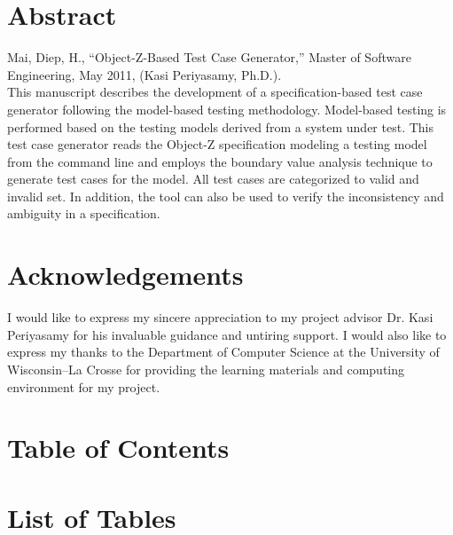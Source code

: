 \documentclass[letterpaper,12pt]{report}
\begin{document}
\hypersetup{pageanchor=false}
	
\clearpage


\clearpage

\hypersetup{pageanchor=true}
\setcounter{page}{1}
\renewcommand\arraystretch{1.5}

\section*{Abstract}
Mai, Diep, H., ``Object-Z-Based Test Case Generator,'' Master of Software Engineering, May 2011, (Kasi Periyasamy, Ph.D.). \\

This manuscript describes the development of a specification-based test case generator following the model-based testing methodology. Model-based testing is performed based on the testing models derived from a system under test. This test case generator reads the Object-Z specification modeling a testing model from the command line and employs the boundary value analysis technique to generate test cases for the model. All test cases are categorized to valid and invalid set. In addition, the tool can also be used to verify the inconsistency and ambiguity in a specification.
\clearpage

\section*{Acknowledgements}
I would like to express my sincere appreciation to my project advisor Dr. Kasi Periyasamy for his invaluable guidance and untiring support. I would also like to express my thanks to the Department of Computer Science at the University of Wisconsin--La Crosse for providing the learning materials and computing environment for my project.
\clearpage

\section*{Table of Contents}
\tableofcontents
\clearpage


\section*{List of Tables}
\listoftables
\clearpage
\end{document}
